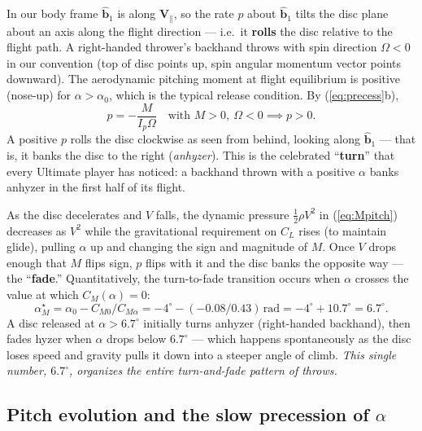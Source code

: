 \documentclass[11pt,letterpaper]{article}
\begin{document}
In our body frame $\hat{\mathbf{b}}_1$ is along $\mathbf{V}_\parallel$, so the rate $p$ about $\hat{\mathbf{b}}_1$ tilts the disc plane about an axis along the flight direction --- i.e.\ it \textbf{rolls} the disc relative to the flight path. A right-handed thrower's backhand throws with spin direction $\Omega < 0$ in our convention (top of disc points up, spin angular momentum vector points downward). The aerodynamic pitching moment at flight equilibrium is positive (nose-up) for $\alpha > \alpha_0$, which is the typical release condition. By (\ref{eq:precess}b),
\begin{equation}
p = -\frac{M}{I_p \Omega} \quad \text{with } M > 0,\ \Omega < 0 \implies p > 0.
\end{equation}
A positive $p$ rolls the disc clockwise as seen from behind, looking along $\hat{\mathbf{b}}_1$ --- that is, it banks the disc to the right (\emph{anhyzer}). This is the celebrated ``\textbf{turn}'' that every Ultimate player has noticed: a backhand thrown with a positive $\alpha$ banks anhyzer in the first half of its flight.

As the disc decelerates and $V$ falls, the dynamic pressure $\tfrac{1}{2}\rho V^2$ in (\ref{eq:Mpitch}) decreases as $V^2$ while the gravitational requirement on $C_L$ rises (to maintain glide), pulling $\alpha$ up and changing the sign and magnitude of $M$. Once $V$ drops enough that $M$ flips sign, $p$ flips with it and the disc banks the opposite way --- the ``\textbf{fade}.'' Quantitatively, the turn-to-fade transition occurs when $\alpha$ crosses the value at which $C_M(\alpha) = 0$:
\begin{equation}
\alpha_M^\star = \alpha_0 - C_{M0}/C_{M\alpha} = -4^\circ - (-0.08/0.43)\,\text{rad} = -4^\circ + 10.7^\circ = 6.7^\circ.
\label{eq:trimangle}
\end{equation}
A disc released at $\alpha > 6.7^\circ$ initially turns anhyzer (right-handed backhand), then fades hyzer when $\alpha$ drops below $6.7^\circ$ --- which happens spontaneously as the disc loses speed and gravity pulls it down into a steeper angle of climb. \emph{This single number, $6.7^\circ$, organizes the entire turn-and-fade pattern of throws.}

\subsection{Pitch evolution and the slow precession of $\alpha$}
\end{document}
